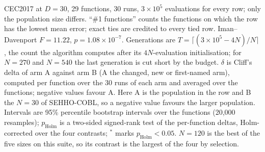 \begin{table}[htbp]
\centering
\caption{The population sweep in SEHHO-COBL on CEC2017 at $D=30$ with $3\times10^{5}$ evaluations.}
\label{tab:popsize}
\begin{flushleft}\footnotesize
CEC2017 at $D=30$, 29 functions, 30 runs, $3\times10^{5}$ evaluations for every row; only the population size differs. ``\#1 functions'' counts the functions on which the row has the lowest mean error; exact ties are credited to every tied row. Iman--Davenport $F=11.22$, $p=1.08\times10^{-7}$. Generations are $T=\lceil(3\times10^{5}-4N)/N\rceil$, the count the algorithm computes after its $4N$-evaluation initialisation; for $N=270$ and $N=540$ the last generation is cut short by the budget. $\delta$ is Cliff's delta of arm A against arm B (A the changed, new or first-named arm), computed per function over the 30 runs of each arm and averaged over the functions; negative values favour A. Here A is the population in the row and B the $N=30$ of SEHHO-COBL, so a negative value favours the larger population. Intervals are 95\% percentile bootstrap intervals over the functions (20{,}000 resamples); $p_{\text{Holm}}$ is a two-sided signed-rank test of the per-function deltas, Holm-corrected over the four contrasts; $^{*}$ marks $p_{\text{Holm}}<0.05$. $N=120$ is the best of the five sizes on this suite, so its contrast is the largest of the four by selection.
\end{flushleft}
\end{table}

